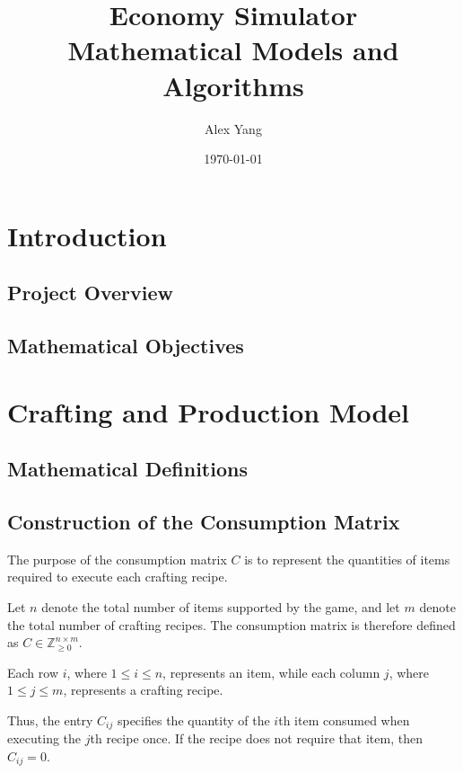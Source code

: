 \documentclass[11pt, a4paper]{article}
\title{
    \textbf{Economy Simulator}\\
    \large Mathematical Models and Algorithms
}
\author{Alex Yang}
\date{\today}
\begin{document}
\maketitle

\begin{abstract}
\end{abstract}

\tableofcontents

\newpage

\section{Introduction}

\subsection{Project Overview}

\subsection{Mathematical Objectives}

\section{Crafting and Production Model}

\subsection{Mathematical Definitions}

\subsection{Construction of the Consumption Matrix}

The purpose of the consumption matrix $C$ is to represent the quantities of items required to execute each crafting recipe.

Let $n$ denote the total number of items supported by the game, and let $m$ denote the total number of crafting recipes. The consumption matrix is therefore defined as
$C \in \mathbb{Z}_{\geq 0}^{n \times m}.$

Each row $i$, where $1 \leq i \leq n$, represents an item, while each column $j$, where $1 \leq j \leq m$, represents a crafting recipe.

Thus, the entry $C_{ij}$ specifies the quantity of the $i$th item consumed when executing the $j$th recipe once. If the recipe does not require that item, then $C_{ij}=0$.
\end{document}
